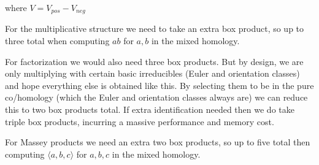 where $V=V_{pos}-V_{neg}$


\begin{DoxyItemize}
\item For the multiplicative structure we need to take an extra box product, so up to three total when computing $ab$ for $a,b$ in the mixed homology.
\item For factorization we would also need three box products. But by design, we are only multiplying with certain basic irreducibles (Euler and orientation classes) and hope everything else is obtained like this. By selecting them to be in the pure co/homology (which the Euler and orientation classes always are) we can reduce this to two box products total. If extra identification needed then we do take triple box products, incurring a massive performance and memory cost.
\item For Massey products we need an extra two box products, so up to five total then computing $\langle a,b,c\rangle $ for $a,b,c$ in the mixed homology. 
\end{DoxyItemize}